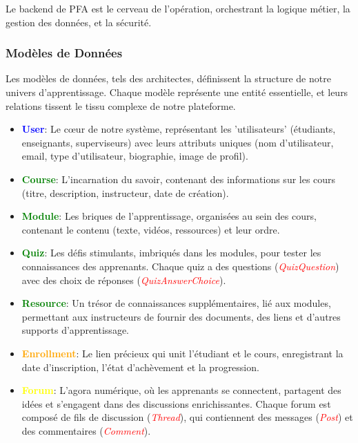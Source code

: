 Le backend de PFA est le cerveau de l'opération, orchestrant la logique métier, la gestion des données, et la sécurité.

\subsubsection{Modèles de Données}

Les modèles de données, tels des architectes, définissent la structure de notre univers d'apprentissage. Chaque modèle représente une entité essentielle, et leurs relations tissent le tissu complexe de notre plateforme.

\begin{itemize}
    \item \textbf{\textcolor{blue}{User}}: Le cœur de notre système, représentant les 'utilisateurs' (étudiants, enseignants, superviseurs) avec leurs attributs uniques (nom d'utilisateur, email, type d'utilisateur, biographie, image de profil).
    \item \textbf{\textcolor{green}{Course}}: L'incarnation du savoir, contenant des informations sur les cours (titre, description, instructeur, date de création).
    \item \textbf{\textcolor{green}{Module}}: Les briques de l'apprentissage, organisées au sein des cours, contenant le contenu (texte, vidéos, ressources) et leur ordre.
    \item \textbf{\textcolor{green}{Quiz}}: Les défis stimulants, imbriqués dans les modules, pour tester les connaissances des apprenants. Chaque quiz a des questions (\textit{\textcolor{red}{QuizQuestion}}) avec des choix de réponses (\textit{\textcolor{red}{QuizAnswerChoice}}).
    \item \textbf{\textcolor{green}{Resource}}: Un trésor de connaissances supplémentaires, lié aux modules, permettant aux instructeurs de fournir des documents, des liens et d'autres supports d'apprentissage.
    \item \textbf{\textcolor{orange}{Enrollment}}: Le lien précieux qui unit l'étudiant et le cours, enregistrant la date d'inscription, l'état d'achèvement et la progression.
    \item \textbf{\textcolor{yellow}{Forum}}: L'agora numérique, où les apprenants se connectent, partagent des idées et s'engagent dans des discussions enrichissantes. Chaque forum est composé de fils de discussion (\textit{\textcolor{red}{Thread}}), qui contiennent des messages (\textit{\textcolor{red}{Post}}) et des commentaires (\textit{\textcolor{red}{Comment}}).
\end{itemize}

